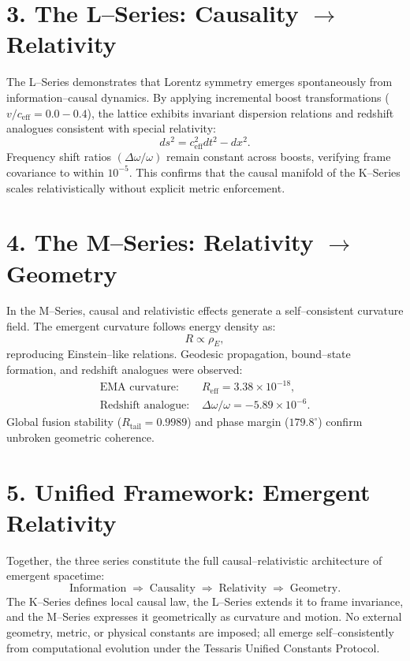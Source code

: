 \documentclass[11pt,a4paper]{article}
\begin{document}
\section{3. The L--Series: Causality $\rightarrow$ Relativity}
The L--Series demonstrates that Lorentz symmetry emerges spontaneously from information--causal dynamics.  
By applying incremental boost transformations (\(v/c_{\mathrm{eff}}=0.0{-}0.4\)), the lattice exhibits invariant dispersion relations and redshift analogues consistent with special relativity:
\[
ds^2 = c_{\mathrm{eff}}^2 dt^2 - dx^2.
\]
Frequency shift ratios \((\Delta\omega/\omega)\) remain constant across boosts, verifying frame covariance to within \(10^{-5}\).  
This confirms that the causal manifold of the K--Series scales relativistically without explicit metric enforcement.

\section{4. The M--Series: Relativity $\rightarrow$ Geometry}
In the M--Series, causal and relativistic effects generate a self--consistent curvature field.  
The emergent curvature follows energy density as:
\[
R \propto \rho_E,
\]
reproducing Einstein--like relations.  
Geodesic propagation, bound--state formation, and redshift analogues were observed:
\begin{align*}
\text{EMA curvature: } & R_{\mathrm{eff}}=3.38\times10^{-18},\\
\text{Redshift analogue: } & \Delta\omega/\omega=-5.89\times10^{-6}.
\end{align*}
Global fusion stability (\(R_{\mathrm{tail}}=0.9989\)) and phase margin (\(179.8^\circ\)) confirm unbroken geometric coherence.

\section{5. Unified Framework: Emergent Relativity}
Together, the three series constitute the full causal--relativistic architecture of emergent spacetime:
\[
\text{Information} \;\Rightarrow\; \text{Causality} \;\Rightarrow\; \text{Relativity} \;\Rightarrow\; \text{Geometry}.
\]
The K--Series defines local causal law, the L--Series extends it to frame invariance, and the M--Series expresses it geometrically as curvature and motion.  
No external geometry, metric, or physical constants are imposed; all emerge self--consistently from computational evolution under the Tessaris Unified Constants Protocol.
\end{document}

